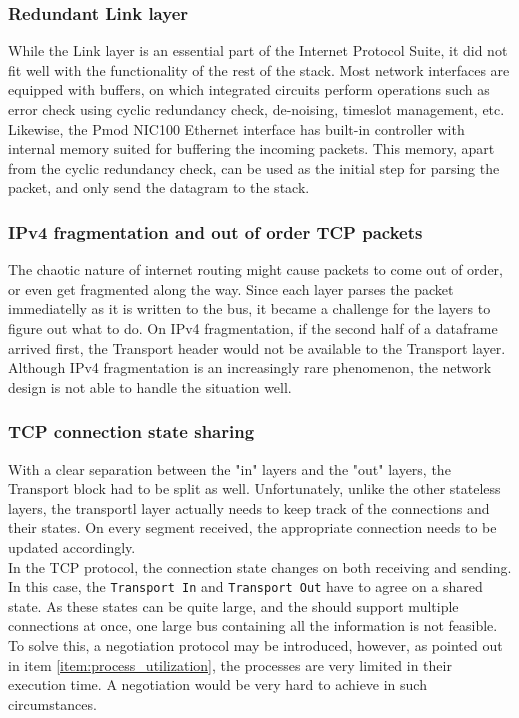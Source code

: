 \subsubsection{Redundant Link layer}
While the Link layer is an essential part of the Internet Protocol Suite, it did 
not fit well with the functionality of the rest of the stack. 
Most network interfaces are equipped with buffers, on which integrated circuits
perform operations such as error check using cyclic redundancy check, de-noising,
timeslot management, etc. 
Likewise, the Pmod NIC100 Ethernet interface has built-in controller with 
internal memory suited for buffering the incoming packets\cite{microchip_enc424j600}.
This memory, apart from the cyclic redundancy check, can be used as the initial
step for parsing the packet, and only send the datagram to the stack.


\subsubsection{IPv4 fragmentation and out of order TCP packets}
The chaotic nature of internet routing might cause packets to come out of order,
or even get fragmented along the way. Since each layer parses the packet immediatelly
as it is written to the bus, it became a challenge for the layers to figure out 
what to do. On IPv4 fragmentation, if the second half of a dataframe arrived 
first, the Transport header would not be available to the Transport layer. 
Although IPv4 fragmentation is an increasingly rare phenomenon, the network 
design is not able to handle the situation well.  


\subsubsection{TCP connection state sharing}
With a clear separation between the "in" layers and the "out" layers, the 
Transport block had to be split as well. Unfortunately, unlike the other stateless
layers, the transportl layer actually needs to keep track of the connections and 
their states. On every segment received, the appropriate connection needs to be 
updated accordingly.\\
In the TCP protocol, the connection state changes on both receiving and sending.
In this case, the \texttt{Transport In} and \texttt{Transport Out} have to 
agree on a shared state. As these states can be quite large, and the should 
support multiple connections at once, one large bus containing all the information
is not feasible. To solve this, a negotiation protocol may be introduced, however,
as pointed out in item \ref{item:process_utilization}, the processes are very
limited in their execution time. A negotiation would be very hard to achieve in 
such circumstances.


